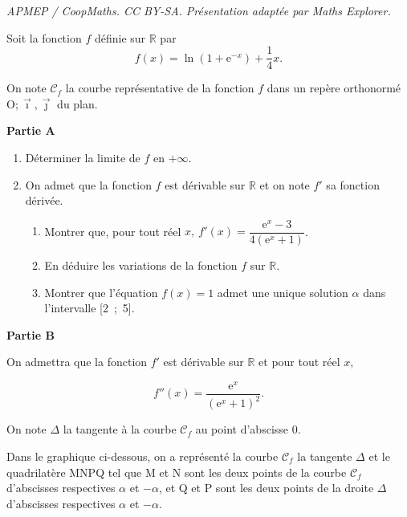 \documentclass[10pt]{article}
\providecommand{\R}{\mathbb{R}}
\providecommand{\e}{{\mathrm{e}}}
\providecommand{\Oij}{\(\mathrm{O};\vec{\imath},\vec{\jmath}\)}
\begin{document}
\noindent\textit{APMEP / CoopMaths. CC BY-SA. Présentation adaptée par Maths Explorer.}\par\medskip
\medskip

Soit la fonction $f$ définie sur $\R$ par 
\[f(x) = \ln \left(1 + \text{e}^{-x}\right) + \dfrac14 x.\]

On note $\mathcal{C}_f$ la courbe représentative de la fonction $f$ dans un repère orthonormé \Oij{} du plan.

\medskip

\textbf{Partie A}

\medskip

\begin{enumerate}
\item Déterminer la limite de $f$ en $+ \infty$.
\item On admet que la fonction $f$ est dérivable sur $\R$ et on note $f'$ sa fonction dérivée.
	\begin{enumerate}
		\item Montrer que, pour tout réel $x,\: f'(x) = \dfrac{\e^x - 3}{4\left(\e^x + 1\right)}$.
		\item En déduire les variations de la fonction $f$ sur $\R$.
		\item Montrer que l'équation $f(x) = 1$ admet une unique solution $\alpha$ dans l'intervalle [2~;~5].
	\end{enumerate}
\end{enumerate}

\medskip

\textbf{Partie B}

\medskip

On admettra que la fonction $f'$ est dérivable sur $\R$ et pour tout réel $x$,

\[f''(x) = \dfrac{\e^x}{\left(\e^x + 1\right)^2}.\]

On note $\Delta$ la tangente à la courbe $\mathcal{C}_f$ au point d'abscisse $0$.

Dans le graphique ci-dessous, on a représenté la courbe $\mathcal{C}_f$ la tangente $\Delta$ et le quadrilatère MNPQ tel que M et N sont les deux points de la courbe $\mathcal{C}_f$ d'abscisses respectives $\alpha$ et $- \alpha$, et Q et P sont les deux points de la droite $\Delta$ d'abscisses respectives $\alpha$ et $- \alpha$.
\end{document}
